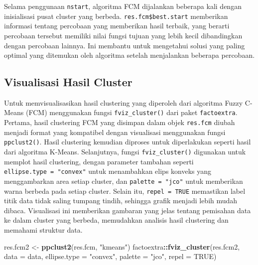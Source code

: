 \documentclass[
  oneside]{book}
\newenvironment{Shaded}{\begin{snugshade}}{\end{snugshade}}
\newcommand{\AttributeTok}[1]{\textcolor[rgb]{0.13,0.29,0.53}{#1}}
\newcommand{\CommentTok}[1]{\textcolor[rgb]{0.56,0.35,0.01}{\textit{#1}}}
\newcommand{\ConstantTok}[1]{\textcolor[rgb]{0.56,0.35,0.01}{#1}}
\newcommand{\FunctionTok}[1]{\textcolor[rgb]{0.13,0.29,0.53}{\textbf{#1}}}
\newcommand{\NormalTok}[1]{#1}
\newcommand{\OtherTok}[1]{\textcolor[rgb]{0.56,0.35,0.01}{#1}}
\newcommand{\SpecialCharTok}[1]{\textcolor[rgb]{0.81,0.36,0.00}{\textbf{#1}}}
\newcommand{\StringTok}[1]{\textcolor[rgb]{0.31,0.60,0.02}{#1}}
\begin{document}
Selama penggunaan \texttt{nstart}, algoritma FCM dijalankan beberapa kali dengan inisialisasi pusat cluster yang berbeda. \texttt{res.fcm\$best.start} memberikan informasi tentang percobaan yang memberikan hasil terbaik, yang berarti percobaan tersebut memiliki nilai fungsi tujuan yang lebih kecil dibandingkan dengan percobaan lainnya. Ini membantu untuk mengetahui solusi yang paling optimal yang ditemukan oleh algoritma setelah menjalankan beberapa percobaan.

\begin{Shaded}
\end{Shaded}

\subsection*{Visualisasi Hasil Cluster}\label{visualisasi-hasil-cluster-1}

Untuk memvisualisasikan hasil clustering yang diperoleh dari algoritma Fuzzy C-Means (FCM) menggunakan fungsi \texttt{fviz\_cluster()} dari paket \texttt{factoextra}. Pertama, hasil clustering FCM yang disimpan dalam objek \texttt{res.fcm} diubah menjadi format yang kompatibel dengan visualisasi menggunakan fungsi \texttt{ppclust2()}. Hasil clustering kemudian diproses untuk diperlakukan seperti hasil dari algoritma K-Means. Selanjutnya, fungsi \texttt{fviz\_cluster()} digunakan untuk memplot hasil clustering, dengan parameter tambahan seperti \texttt{ellipse.type\ =\ "convex"} untuk menambahkan elips konveks yang menggambarkan area setiap cluster, dan \texttt{palette\ =\ "jco"} untuk memberikan warna berbeda pada setiap cluster. Selain itu, \texttt{repel\ =\ TRUE} memastikan label titik data tidak saling tumpang tindih, sehingga grafik menjadi lebih mudah dibaca. Visualisasi ini memberikan gambaran yang jelas tentang pemisahan data ke dalam cluster yang berbeda, memudahkan analisis hasil clustering dan memahami struktur data.

\begin{Shaded}
\begin{Highlighting}[]
\NormalTok{res.fcm2 }\OtherTok{\textless{}{-}} \FunctionTok{ppclust2}\NormalTok{(res.fcm, }\StringTok{"kmeans"}\NormalTok{)}
\NormalTok{factoextra}\SpecialCharTok{::}\FunctionTok{fviz\_cluster}\NormalTok{(res.fcm2, }\AttributeTok{data =}\NormalTok{ data, }
  \AttributeTok{ellipse.type =} \StringTok{"convex"}\NormalTok{,}
  \AttributeTok{palette =} \StringTok{"jco"}\NormalTok{,}
  \AttributeTok{repel =} \ConstantTok{TRUE}\NormalTok{)}
\end{Highlighting}
\end{Shaded}
\end{document}
